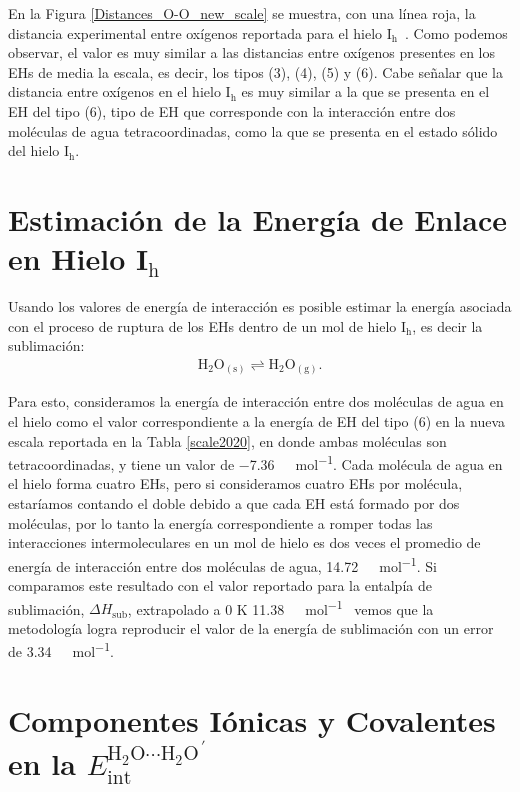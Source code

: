 En la Figura \ref{Distances_O-O_new_scale} se muestra, con una línea roja, la
distancia experimental entre oxígenos reportada para el hielo
$\mathrm{I_{h}}$~\cite{schulson}. Como podemos observar, el valor es muy
similar a las distancias entre oxígenos presentes en los EHs de media la
escala, es decir, los tipos (3), (4), (5) y (6). Cabe señalar que la distancia
entre oxígenos en el hielo $\mathrm{I_{h}}$ es muy similar a la que se presenta
en el EH del tipo (6), tipo de EH que corresponde con la in\-te\-rac\-ción
entre dos moléculas de agua tetracoordinadas, como la que se presenta en el
estado sólido del hielo $\mathrm{I_{h}}$.

\section{Estimación de la Energía de Enlace en Hielo I$\mathrm{_{h}}$}

Usando los valores de energía de interacción es posible estimar la energía
asociada con el proceso de ruptura de los EHs dentro de un mol de hielo
$\mathrm{I_{h}}$, es decir la sublimación:
%
\begin{align}
\mathrm{H_2O_{(s)}} \rightleftharpoons \mathrm{H_2O_{(g)}}.
\end{align}

Para esto, consideramos la energía de interacción entre dos moléculas de agua
en el hielo como el valor correspondiente a la energía de EH del tipo (6) en la
nueva escala reportada en la Tabla \ref{scale2020}, en donde ambas moléculas
son tetracoordinadas, y tiene un valor de \SI{-7.36}{\kilo \calorie \per
\mole}. Cada molécula de agua en el hielo forma cuatro EHs, pero si
consideramos cuatro EHs por molécula, estaríamos contando el doble debido a que
cada EH está formado por dos moléculas, por lo tanto la energía correspondiente
a romper todas las interacciones intermoleculares en un mol de hielo es dos
veces el promedio de energía de interacción entre dos moléculas de agua,
\SI{14.72}{\kilo \calorie \per \mole}. Si comparamos este resultado con el
valor reportado para la entalpía de sublimación, $\Delta H_\mathrm{sub}$,
extrapolado a 0 K \SI{11.38}{\kilo \calorie \per \mole}~\cite{Feistel2007}
vemos que la metodología logra reproducir el valor de la energía de sublimación
con un error de \SI{3.34}{\kilo \calorie \per \mole}.

\section{Componentes Iónicas y Covalentes en la ${E_{\mathrm{int}}^{\mathrm{H_2O}\cdots\mathrm{H_2O}^{ \, \prime}}}$}

